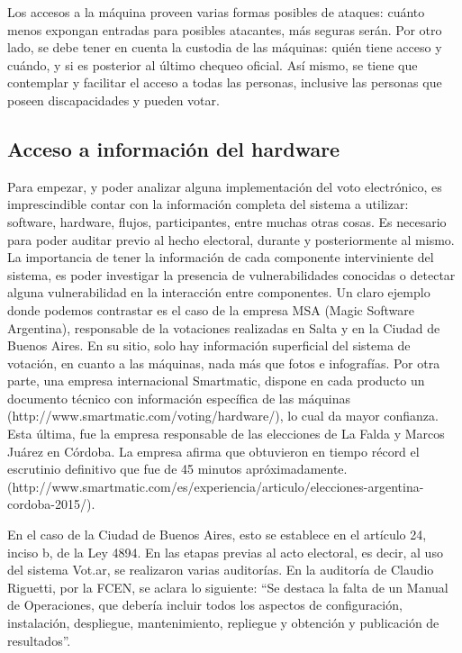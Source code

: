 Los accesos a la máquina proveen varias formas posibles de ataques: cuánto menos expongan entradas para posibles atacantes, más seguras serán. Por otro lado, se debe tener en cuenta la custodia de las máquinas: quién tiene acceso y cuándo, y si es posterior al último chequeo oficial. Así mismo, se tiene que contemplar y facilitar el acceso a todas las personas, inclusive las personas que poseen discapacidades y pueden votar.

\subsection{Acceso a información del hardware}

Para empezar, y poder analizar alguna implementación del voto electrónico, es imprescindible contar con la información completa del sistema a utilizar: software, hardware, flujos, participantes, entre muchas otras cosas. Es necesario para poder auditar previo al hecho electoral, durante y posteriormente al mismo. La importancia de tener la información de cada componente interviniente del sistema, es poder investigar la presencia de vulnerabilidades conocidas o detectar alguna vulnerabilidad en la interacción entre componentes. Un claro ejemplo donde podemos contrastar es el caso de la empresa MSA (Magic Software Argentina), responsable de la votaciones realizadas en Salta y en la Ciudad de Buenos Aires. En su sitio, solo hay información superficial del sistema de votación, en cuanto a las máquinas, nada más que fotos e infografías. Por otra parte, una empresa internacional Smartmatic, dispone en cada producto un documento técnico con información específica de las máquinas (http://www.smartmatic.com/voting/hardware/), lo cual da mayor confianza. Esta última, fue la empresa responsable de las elecciones de La Falda y Marcos Juárez en Córdoba. La empresa afirma que obtuvieron en tiempo récord el escrutinio definitivo que fue de 45 minutos apróximadamente. (http://www.smartmatic.com/es/experiencia/articulo/elecciones-argentina-cordoba-2015/).

En el caso de la Ciudad de Buenos Aires, esto se establece en el artículo 24, inciso b, de la Ley 4894. En las etapas previas al acto electoral, es decir, al uso del sistema Vot.ar, se realizaron varias auditorías.
En la auditoría de Claudio Riguetti, por la FCEN, se aclara lo siguiente: “Se destaca la falta de un Manual de Operaciones, que debería incluir todos los aspectos de configuración, instalación, despliegue, mantenimiento, repliegue y obtención y publicación de resultados”.

